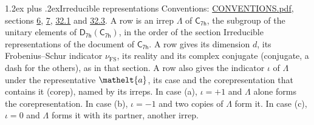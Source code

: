 \documentclass[10pt,a4paper]{article}
\makeatletter
\renewcommand\section{\@startsection{section}{1}{\z@}{-3ex plus -1ex minus -.2ex}%
  {1.2ex plus .2ex}{\normalfont\large\sffamily\bfseries\color{parttitle}}}
\numberwithin{equation}{section}
\newcommand{\eltfont}[1]{{\let\sigma\eltsigma\mathelt{#1}}}
\newcommand{\grp}[1]{\mathsf{#1}}
\newcommand{\elt}[1]{\eltfont{#1}}
\newcommand{\fsind}{\nu_{\mathrm{FS}}}
\makeatother
\begin{document}
\section{Irreducible representations}\label{s:irreps}
Conventions: \href{../../CONVENTIONS.pdf}{CONVENTIONS.pdf}, sections \href{../../../rotation/CONVENTIONS.pdf\#conv.6}{6}, \href{../../../rotation/CONVENTIONS.pdf\#conv.7}{7}, \href{../../CONVENTIONS.pdf\#conv.32.1}{32.1} and \href{../../CONVENTIONS.pdf\#conv.32.3}{32.3}.
\leavevmode\label{n:irrep.Delta}A row is an irrep $\Lambda$ of $\grp{C_{7h}}$, the subgroup of the unitary elements of $\grp{D_{7h}}(\grp{C_{7h}})$, in the order of the section Irreducible representations of the document of \href{../../../rotation/data/pdf/C7h.pdf}{$\grp{C_{7h}}$}. \label{n:index.dimension}\label{n:index.frobenius}\label{n:head.irrep}\label{n:head.reality}\label{n:head.conjugate}A row gives its dimension $d$, its Frobenius--Schur indicator $\fsind$, its reality and its complex conjugate (conjugate, a dash for the others), as in that section. \label{n:head.case.corep}\label{n:head.corep}A row also gives the indicator $\iota$ of $\Lambda$ under the representative $\elt{a}$, its case and the corepresentation that contains it (corep), named by its irreps. In case (a), $\iota = +1$ and $\Lambda$ alone forms the corepresentation. In case (b), $\iota = -1$ and two copies of $\Lambda$ form it. In case (c), $\iota = 0$ and $\Lambda$ forms it with its partner, another irrep.
\setlength{\emergencystretch}{2em}\par\setlength{\emergencystretch}{0pt}
\end{document}
